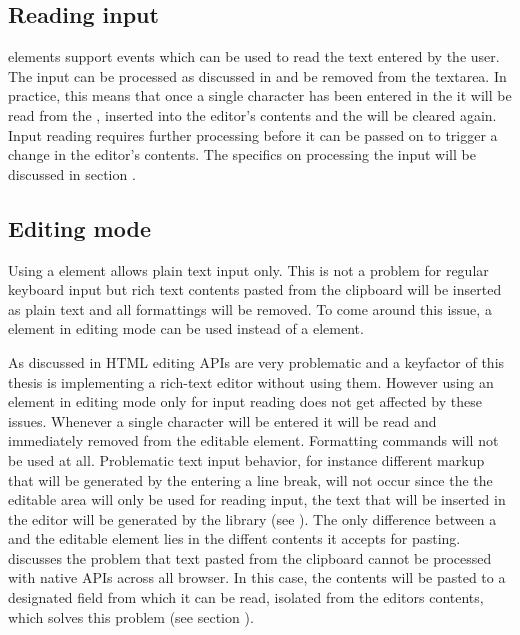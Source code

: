 \subsection{Reading input}  elements support  events which can be used to read the text entered by the user. The input can be processed as discussed in  and be removed from the textarea. In practice, this means that once a single character has been entered in the  it will be read from the , inserted into the editor's contents and the  will be cleared again. Input reading requires further processing before it can be passed on to trigger a change in the editor's contents. The specifics on processing the input will be discussed in section .

\subsection{Editing mode} Using a  element allows plain text input only. This is not a problem for regular keyboard input but rich text contents pasted from the clipboard will be inserted as plain text and all formattings will be removed. To come around this issue, a  element in editing mode can be used instead of a  element.

As discussed in  HTML editing APIs are very problematic and a keyfactor of this thesis is implementing a rich-text editor without using them. However using an element in editing mode only for input reading does not get affected by these issues. Whenever a single character will be entered it will be read and immediately removed from the editable element. Formatting commands will not be used at all. Problematic text input behavior, for instance different markup that will be generated by the entering a line break, will not occur since the the editable area will only be used for reading input, the text that will be inserted in the editor will be generated by the library (see ). The only difference between a  and the editable element lies in the diffent contents it accepts for pasting.  discusses the problem that text pasted from the clipboard cannot be processed with native APIs across all browser. In this case, the contents will be pasted to a designated field from which it can be read, isolated from the editors contents, which solves this problem (see section ).


